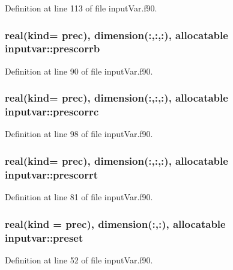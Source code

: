 Definition at line 113 of file input\-Var.\-f90.

\hypertarget{classinputvar_a4de979203fa5e65fe0cbfd77c60654ae}{
\subsubsection[{prescorrb}]{\setlength{\rightskip}{0pt plus 5cm}real(kind= prec), dimension(\-:,\-:,\-:), allocatable inputvar\-::prescorrb}}\label{classinputvar_a4de979203fa5e65fe0cbfd77c60654ae}


Definition at line 90 of file input\-Var.\-f90.

\hypertarget{classinputvar_a4ad15e4562f67332a82dd70d6cfcb2fc}{
\subsubsection[{prescorrc}]{\setlength{\rightskip}{0pt plus 5cm}real(kind= prec), dimension(\-:,\-:,\-:), allocatable inputvar\-::prescorrc}}\label{classinputvar_a4ad15e4562f67332a82dd70d6cfcb2fc}


Definition at line 98 of file input\-Var.\-f90.

\hypertarget{classinputvar_a4dc6d715b00d35dbff920be5c37c1d89}{
\subsubsection[{prescorrt}]{\setlength{\rightskip}{0pt plus 5cm}real(kind= prec), dimension(\-:,\-:,\-:), allocatable inputvar\-::prescorrt}}\label{classinputvar_a4dc6d715b00d35dbff920be5c37c1d89}


Definition at line 81 of file input\-Var.\-f90.

\hypertarget{classinputvar_aa1aed76f7740ae664d53528987ef0efa}{
\subsubsection[{preset}]{\setlength{\rightskip}{0pt plus 5cm}real(kind = prec), dimension(\-:,\-:), allocatable inputvar\-::preset}}\label{classinputvar_aa1aed76f7740ae664d53528987ef0efa}


Definition at line 52 of file input\-Var.\-f90.

